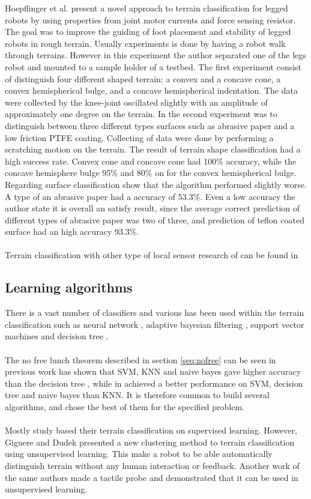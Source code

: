 \documentclass[USenglish]{ifimaster}  %
\begin{document}
	Hoepflinger et al. \cite{5509309} present a novel approach to terrain classification for legged robots by using properties from joint motor currents and force sensing resistor. The goal was to improve the guiding of foot placement and stability of legged robots in rough terrain. Usually experiments is done by having a robot walk through terrains. However in this experiment the author separated one of the legs robot and mounted to a sample holder of a testbed. The first experiment consist of distinguish four different shaped terrain: a convex and a concave cone, a convex hemispherical bulge, and a concave hemispherical indentation. The data were collected by the knee-joint oscillated slightly with an amplitude of approximately one degree on the terrain. In the second experiment was to distinguish between three different types surfaces such as abrasive paper and a low friction PTFE coating. Collecting of data were done by performing a scratching motion on the terrain. The result of terrain shape classification had a high success rate. Convex cone and concave cone had 100\% accuracy, while the concave hemisphere bulge 95\% and 80\% on for the convex hemispherical bulge. Regarding surface classification show that the algorithm performed slightly worse. A type of an abrasive paper had a accuracy of 53.3\%. Even a low accuracy the author state it is overall an satisfy result, since the average correct prediction of different types of abrasive paper was two of three, and prediction of teflon coated surface had an high accuracy 93.3\%.
	\\
	\\
	Terrain classification with other type of local sensor research of can be found in \cite{Giguere2009,6386243,6569179,6569179,4399500}
	
	\subsection{Learning algorithms}
	There is a vast number of classifiers and various has been used within the terrain classification such as neural network \cite{6784609,5752869,4654717}, adaptive bayesian filtering \cite{5152327,6849778}, support vector machines \cite{5602459,4161556,4059113} and decision tree \cite{6849778}.
	\\
	\\
	The no free lunch theorem described in section \ref{seq:nofree} can be seen in previous work has shown that SVM, KNN and naive bayes gave higher accuracy than the decision tree \cite{DBLP:conf/emcr/WeissFSZ07}, while in \cite{6849778} achieved a better performance on SVM, decision tree and naive bayes than KNN. It is therefore common to build several algorithms, and chose the best of them for the specified problem. 
	\\
	\\
	Mostly study based their terrain classification on supervised learning. However, Giguere and Dudek \cite{Giguere2009} presented a new clustering method to terrain classification using unsupervised learning. This make a robot to be able automatically distinguish terrain without any human interaction or feedback. Another work of the same authors
	\cite{5752869} made a tactile probe and demonstrated that it can be used in unsupervised learning.
	
\end{document}
